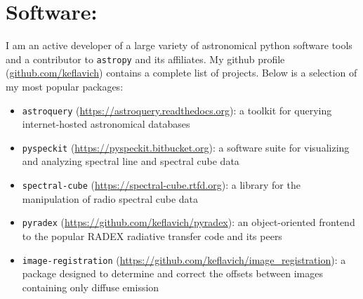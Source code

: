 \section*{Software:}
\vspace{-10pt}
I am an active developer of a large variety of astronomical python software
tools and a contributor to \texttt{astropy} and its affiliates.  My github
profile (\url{github.com/keflavich}) contains a complete list of projects.
Below is a selection of my most popular packages:

\begin{itemize}
\itemsep-3pt
    \item \texttt{astroquery} (\url{https://astroquery.readthedocs.org}):
        a toolkit for querying internet-hosted astronomical databases
    \item \texttt{pyspeckit} (\url{https://pyspeckit.bitbucket.org}): a software suite
        for visualizing and analyzing spectral line and spectral cube
        data
    \item \texttt{spectral-cube} (\url{https://spectral-cube.rtfd.org}): a library for the manipulation
        of radio spectral cube data
    \item \texttt{pyradex} (\url{https://github.com/keflavich/pyradex}):
        an object-oriented frontend to the popular RADEX radiative transfer code and
        its peers
    \item \texttt{image-registration} (\url{https://github.com/keflavich/image_registration}):
        a package designed to determine and correct the offsets between images containing only
        diffuse emission
\end{itemize}

